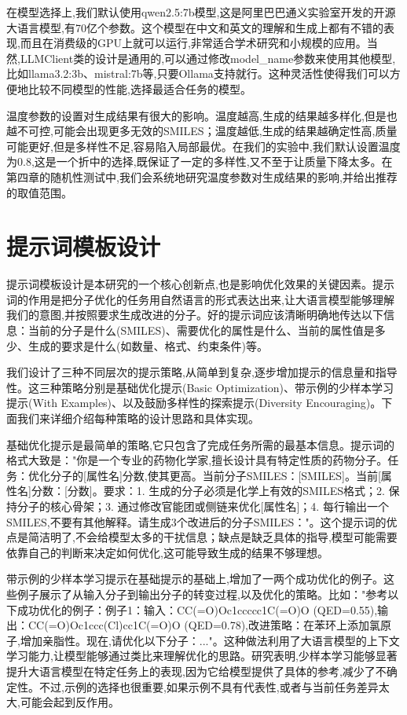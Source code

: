 在模型选择上,我们默认使用qwen2.5:7b模型,这是阿里巴巴通义实验室开发的开源大语言模型,有70亿个参数。这个模型在中文和英文的理解和生成上都有不错的表现,而且在消费级的GPU上就可以运行,非常适合学术研究和小规模的应用。当然,LLMClient类的设计是通用的,可以通过修改model\_name参数来使用其他模型,比如llama3.2:3b、mistral:7b等,只要Ollama支持就行。这种灵活性使得我们可以方便地比较不同模型的性能,选择最适合任务的模型。

温度参数的设置对生成结果有很大的影响。温度越高,生成的结果越多样化,但是也越不可控,可能会出现更多无效的SMILES；温度越低,生成的结果越确定性高,质量可能更好,但是多样性不足,容易陷入局部最优。在我们的实验中,我们默认设置温度为0.8,这是一个折中的选择,既保证了一定的多样性,又不至于让质量下降太多。在第四章的随机性测试中,我们会系统地研究温度参数对生成结果的影响,并给出推荐的取值范围。

\section{提示词模板设计}

提示词模板设计是本研究的一个核心创新点,也是影响优化效果的关键因素。提示词的作用是把分子优化的任务用自然语言的形式表达出来,让大语言模型能够理解我们的意图,并按照要求生成改进的分子。好的提示词应该清晰明确地传达以下信息：当前的分子是什么(SMILES)、需要优化的属性是什么、当前的属性值是多少、生成的要求是什么(如数量、格式、约束条件)等。

我们设计了三种不同层次的提示策略,从简单到复杂,逐步增加提示的信息量和指导性。这三种策略分别是基础优化提示(Basic Optimization)、带示例的少样本学习提示(With Examples)、以及鼓励多样性的探索提示(Diversity Encouraging)。下面我们来详细介绍每种策略的设计思路和具体实现。

基础优化提示是最简单的策略,它只包含了完成任务所需的最基本信息。提示词的格式大致是："你是一个专业的药物化学家,擅长设计具有特定性质的药物分子。任务：优化分子的[属性名]分数,使其更高。当前分子SMILES：[SMILES]。当前[属性名]分数：[分数]。要求：1. 生成的分子必须是化学上有效的SMILES格式；2. 保持分子的核心骨架；3. 通过修改官能团或侧链来优化[属性名]；4. 每行输出一个SMILES,不要有其他解释。请生成3个改进后的分子SMILES："。这个提示词的优点是简洁明了,不会给模型太多的干扰信息；缺点是缺乏具体的指导,模型可能需要依靠自己的判断来决定如何优化,这可能导致生成的结果不够理想。

带示例的少样本学习提示在基础提示的基础上,增加了一两个成功优化的例子。这些例子展示了从输入分子到输出分子的转变过程,以及优化的策略。比如："参考以下成功优化的例子：例子1：输入：CC(=O)Oc1ccccc1C(=O)O (QED=0.55),输出：CC(=O)Oc1ccc(Cl)cc1C(=O)O (QED=0.78),改进策略：在苯环上添加氯原子,增加亲脂性。现在,请优化以下分子：..."。这种做法利用了大语言模型的上下文学习能力,让模型能够通过类比来理解优化的思路。研究表明,少样本学习能够显著提升大语言模型在特定任务上的表现,因为它给模型提供了具体的参考,减少了不确定性。不过,示例的选择也很重要,如果示例不具有代表性,或者与当前任务差异太大,可能会起到反作用。

